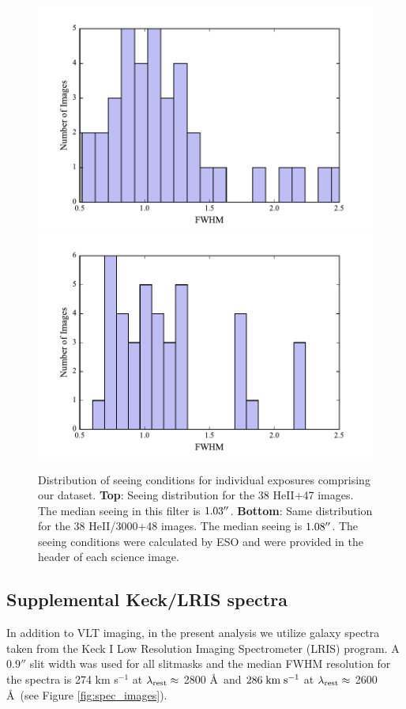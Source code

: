 \documentclass[twocolumn]{aastex61}
\def \mkms {{\rm \; km\;s^{-1}}}
\begin{document}
\begin{figure}[h]
\centering
\includegraphics[scale=.55]{../Figures/avg_seeing_HEII.pdf}
\includegraphics[scale=.55]{../Figures/avg_seeing_HEII3000.pdf}
\caption{  Distribution of seeing conditions for individual exposures comprising our dataset.
\textbf{Top}: Seeing distribution for the 38 HeII+47 images. The median seeing in this filter is $1.03\mbox{$^{\prime\prime}$}$.
\textbf{Bottom}: Same distribution for the 38 HeII/3000+48 images. The median seeing is $1.08\mbox{$^{\prime\prime}$}$. 
The seeing conditions were calculated by ESO and were provided in the header of each science image.
\label{fig.seeing}}
\end{figure}

\subsection{Supplemental Keck/LRIS spectra}
In addition to VLT imaging, in the present analysis we utilize galaxy spectra taken from the \cite{Rubin_2014} Keck I Low Resolution Imaging Spectrometer (LRIS) program. A $0.9''$ slit width was used for all slitmasks and the median FWHM resolution for the spectra is 274 km s$^{-1}$ at $\lambda_{\rm rest} \approx$ 2800 \AA\ and $286\mkms$  at $\lambda_{\rm rest}\approx$ 2600 \AA\ (see Figure \ref{fig:spec_images}).
\end{document}
